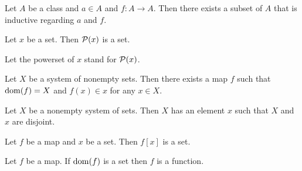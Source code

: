 \documentclass[../../set-theory/set-theory.tex]{subfiles}
\begin{document}
  \begin{forthel}
    \begin{axiom}[Infinity]
      Let $A$ be a class and $a \in A$ and $f : A \to A$.
      Then there exists a subset of $A$ that is inductive regarding $a$ and $f$.
    \end{axiom}
  \end{forthel}

  \begin{forthel}
    \begin{axiom}[Powerset]
      Let $x$ be a set.
      Then $\mathcal{P}(x)$ is a set.
    \end{axiom}

    Let the powerset of $x$ stand for $\mathcal{P}(x)$.
  \end{forthel}

  \begin{forthel}
    \begin{axiom}[Choice]
      Let $X$ be a system of nonempty sets.
      Then there exists a map $f$ such that $\operatorname{dom}(f) = X$ and $f(x) \in x$ for
      any $x \in X$.
    \end{axiom}
  \end{forthel}

  \begin{forthel}
    \begin{axiom}[Foundation]
      Let $X$ be a nonempty system of sets.
      Then $X$ has an element $x$ such that $X$ and $x$ are disjoint.
    \end{axiom}
  \end{forthel}

  \begin{forthel}
    \begin{axiom}[Replacement]
      Let $f$ be a map and $x$ be a set.
      Then $f[x]$ is a set.
    \end{axiom}
  \end{forthel}
  
  \begin{forthel}
    \begin{axiom}[Function]
      Let $f$ be a map.
      If $\operatorname{dom}(f)$ is a set then $f$ is a function.
    \end{axiom}
  \end{forthel}
\end{document}
